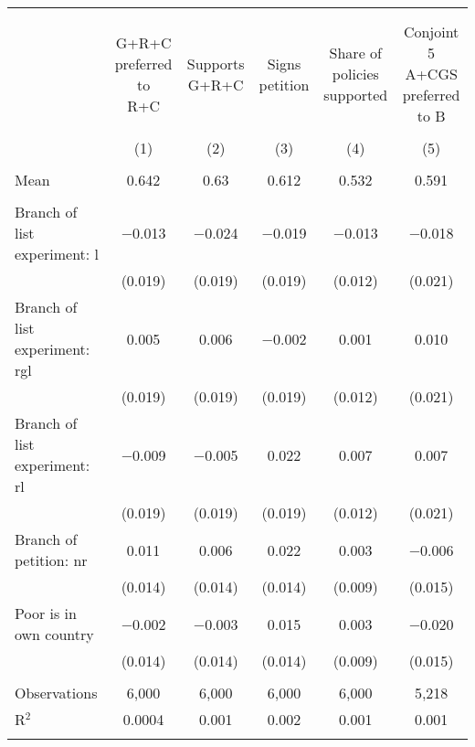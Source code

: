 
\begin{tabular}{@{\extracolsep{5pt}}lccccc} 
\\[-1.8ex]\hline 
\hline \\[-1.8ex] 
\\[-1.8ex] & \makecell{G+R+C\\preferred to\\R+C} & \makecell{Supports\\G+R+C} & \makecell{Signs\\petition} & \makecell{Share of\\policies\\supported} & \makecell{Conjoint 5\\A+CGS\\preferred to B} \\ 
\\[-1.8ex] & (1) & (2) & (3) & (4) & (5)\\ 
\hline \\[-1.8ex] 
Mean & 0.642 & 0.63 & 0.612 & 0.532 & 0.591  \\ \hline \\[-1.8ex]
 Branch of list experiment: l & $-$0.013 & $-$0.024 & $-$0.019 & $-$0.013 & $-$0.018 \\ 
  & (0.019) & (0.019) & (0.019) & (0.012) & (0.021) \\ 
  Branch of list experiment: rgl & 0.005 & 0.006 & $-$0.002 & 0.001 & 0.010 \\ 
  & (0.019) & (0.019) & (0.019) & (0.012) & (0.021) \\ 
  Branch of list experiment: rl & $-$0.009 & $-$0.005 & 0.022 & 0.007 & 0.007 \\ 
  & (0.019) & (0.019) & (0.019) & (0.012) & (0.021) \\ 
  Branch of petition: nr & 0.011 & 0.006 & 0.022 & 0.003 & $-$0.006 \\ 
  & (0.014) & (0.014) & (0.014) & (0.009) & (0.015) \\ 
  Poor is in own country & $-$0.002 & $-$0.003 & 0.015 & 0.003 & $-$0.020 \\ 
  & (0.014) & (0.014) & (0.014) & (0.009) & (0.015) \\ 
 \hline \\[-1.8ex] 

Observations & 6,000 & 6,000 & 6,000 & 6,000 & 5,218 \\ 
R$^{2}$ & 0.0004 & 0.001 & 0.002 & 0.001 & 0.001 \\ 
\hline 
\hline \\[-1.8ex] 
\end{tabular} 